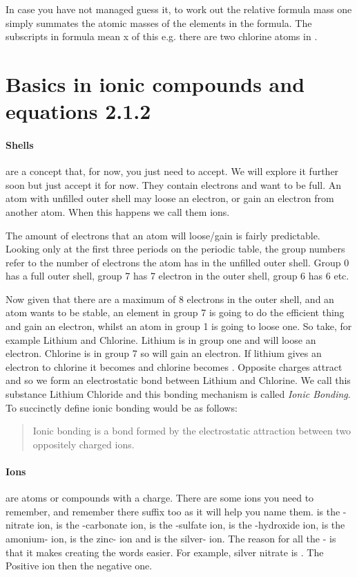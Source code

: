 	In case you have not managed guess it, to work out the relative formula mass one simply summates the atomic masses of the elements in the formula. The subscripts in formula mean x of this e.g. there are two chlorine atoms in .
	
\section{Basics in ionic compounds and equations 2.1.2}
	
	\paragraph{Shells} are a concept that, for now, you just need to accept. We will explore it further soon but just accept it for now. They contain electrons and want to be full. An atom with unfilled outer shell may loose an electron, or gain an electron from another atom. When this happens we call them ions. 
	
	The amount of electrons that an atom will loose/gain is fairly predictable. Looking only at the first three periods on the periodic table, the group numbers refer to the number of electrons the atom has in the unfilled outer shell. Group 0 has a full outer shell, group 7 has 7 electron in the outer shell, group 6 has 6 etc.
	
	Now given that there are a maximum of 8 electrons in the outer shell, and an atom wants to be stable, an element in group 7 is going to do the efficient thing and gain an electron, whilst an atom in group 1 is going to loose one. So take, for example Lithium and Chlorine. Lithium is in group one and will loose an electron. Chlorine is in group 7 so will gain an electron. If lithium gives an electron to chlorine it becomes  and chlorine becomes . Opposite charges attract and so we form an electrostatic bond between Lithium and Chlorine. We call this substance Lithium Chloride and this bonding mechanism is called \textit{Ionic Bonding}. To succinctly define ionic bonding would be as follows:
	
	 \begin{quote}
	 Ionic bonding is a bond formed by the electrostatic attraction between two oppositely charged ions.
	 \end{quote}
	 
	 \paragraph{Ions} are atoms or compounds with a charge. There are some ions you need to remember, and remember there suffix too as it will help you name them.  is the -nitrate ion,  is the -carbonate ion,  is the -sulfate ion,  is the -hydroxide ion,  is the amonium- ion,  is the zinc- ion and  is the silver- ion. The reason for all the - is that it makes creating the words easier. For example, silver nitrate is . The Positive ion then the negative one.
	
